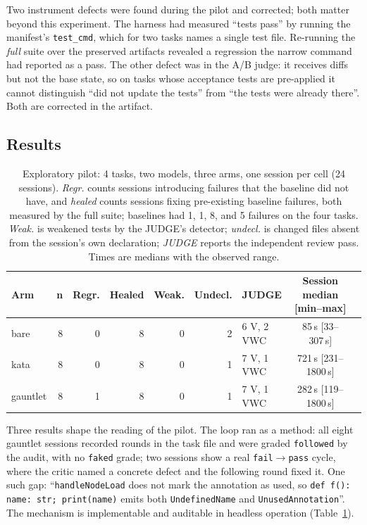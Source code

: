 \documentclass{sbc2019}%
\begin{document}
Two instrument defects were found during the pilot and corrected; both matter
beyond this experiment. The harness had measured ``tests pass'' by
running the manifest's \texttt{test\_cmd}, which for two tasks names a single
test file. Re-running the \emph{full} suite over the preserved artifacts
revealed a regression the narrow command had reported as a pass. The other
defect was in the A/B judge: it receives diffs but not the base state, so on
tasks whose
acceptance tests are pre-applied it cannot distinguish ``did not update the
tests'' from ``the tests were already there''. Both are corrected in the
artifact.

\subsection{Results}

\begin{table}[!ht]
\caption{Exploratory pilot: 4 tasks, two models, three arms, one session per
cell (24 sessions). \emph{Regr.} counts sessions introducing failures that the
baseline did not have, and \emph{healed} counts sessions fixing pre-existing
baseline failures, both measured by the full suite; baselines had 1, 1, 8, and
5 failures on the four tasks. \emph{Weak.} is weakened tests by the JUDGE's
detector; \emph{undecl.} is changed files absent from the session's own
declaration; \emph{JUDGE} reports the independent review pass. Times are
medians with the observed range.}
\centering
\footnotesize
\begin{tabular}{@{}lrrrrrlcc@{}}
\hline\hline
Arm & n & Regr. & Healed & Weak. & Undecl. & JUDGE & Session median [min--max] \\
\hline
bare & 8 & 0 & 8 & 0 & 2 & 6 V, 2 VWC & 85\,s [33--307\,s] \\
kata & 8 & 0 & 8 & 0 & 1 & 7 V, 1 VWC & 721\,s [231--1800\,s] \\
gauntlet & 8 & 1 & 8 & 0 & 1 & 7 V, 1 VWC & 282\,s [119--1800\,s] \\
\hline\hline
\end{tabular}
\label{tab:gauntlet-pilot}
\end{table}

Three results shape the reading of the pilot. The loop ran as a method: all eight
gauntlet sessions recorded rounds in the task file and were graded
\texttt{followed} by the audit, with no \texttt{faked} grade; two sessions show
a real \texttt{fail}$\to$\texttt{pass} cycle, where the critic named a concrete
defect and the following round fixed it. One such gap: ``\texttt{handleNodeLoad}
does not mark the annotation as used, so \texttt{def f(): name: str;
print(name)} emits both \texttt{UndefinedName} and \texttt{UnusedAnnotation}''.
The mechanism is implementable and auditable in headless operation
(Table~\ref{tab:gauntlet-pilot}).
\end{document}

